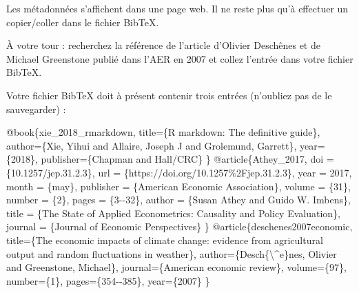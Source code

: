 \documentclass[
  11pt,
]{book}
\newenvironment{Shaded}{\begin{snugshade}}{\end{snugshade}}
\newcommand{\CharTok}[1]{\textcolor[rgb]{0.31,0.60,0.02}{#1}}
\newcommand{\DataTypeTok}[1]{\textcolor[rgb]{0.13,0.29,0.53}{#1}}
\newcommand{\NormalTok}[1]{#1}
\newcommand{\OtherTok}[1]{\textcolor[rgb]{0.56,0.35,0.01}{#1}}
\newcommand{\VariableTok}[1]{\textcolor[rgb]{0.00,0.00,0.00}{#1}}
\numberwithin{equation}{section}
\numberwithin{countremarque}{section}
\newenvironment{greenbox}{
  \begin{tcolorbox}[breakable, colback=vert,coltext=black,
                  colframe=grisfonce]}
 {\end{tcolorbox}}
\begin{document}
Les métadonnées s'affichent dans une page web. Il ne reste plus qu'à effectuer un copier/coller dans le fichier BibTeX.

\begin{greenbox}
À votre tour : recherchez la référence de l'article d'Olivier Deschênes et de Michael Greenstone publié dans l'AER en 2007 et collez l'entrée dans votre fichier BibTeX.

\end{greenbox}

Votre fichier BibTeX doit à présent contenir trois entrées (n'oubliez pas de le sauvegarder) :

\begin{Shaded}
\begin{Highlighting}[]
\VariableTok{@book}\NormalTok{\{}\OtherTok{xie\_2018\_rmarkdown}\NormalTok{,}
  \DataTypeTok{title}\NormalTok{=\{R markdown: The definitive guide\},}
  \DataTypeTok{author}\NormalTok{=\{Xie, Yihui and Allaire, Joseph J and Grolemund, Garrett\},}
  \DataTypeTok{year}\NormalTok{=\{2018\},}
  \DataTypeTok{publisher}\NormalTok{=\{Chapman and Hall/CRC\}}
\NormalTok{\}}
\VariableTok{@article}\NormalTok{\{}\OtherTok{Athey\_2017}\NormalTok{,}
    \DataTypeTok{doi}\NormalTok{ = \{10.1257/jep.31.2.3\},}
    \DataTypeTok{url}\NormalTok{ = \{https://doi.org/10.1257\%2Fjep.31.2.3\},}
    \DataTypeTok{year}\NormalTok{ = 2017,}
    \DataTypeTok{month}\NormalTok{ = \{may\},}
    \DataTypeTok{publisher}\NormalTok{ = \{American Economic Association\},}
    \DataTypeTok{volume}\NormalTok{ = \{31\},}
    \DataTypeTok{number}\NormalTok{ = \{2\},}
    \DataTypeTok{pages}\NormalTok{ = \{3{-}{-}32\},}
    \DataTypeTok{author}\NormalTok{ = \{Susan Athey and Guido W. Imbens\},}
    \DataTypeTok{title}\NormalTok{ = \{The State of Applied Econometrics:}
\NormalTok{    Causality and Policy Evaluation\},}
    \DataTypeTok{journal}\NormalTok{ = \{Journal of Economic Perspectives\}}
\NormalTok{\}}
\VariableTok{@article}\NormalTok{\{}\OtherTok{deschenes2007economic}\NormalTok{,}
  \DataTypeTok{title}\NormalTok{=\{The economic impacts of climate change:}
\NormalTok{  evidence from agricultural output and random fluctuations in weather\},}
  \DataTypeTok{author}\NormalTok{=\{Desch\{}\CharTok{\textbackslash{}\^{}}\NormalTok{e\}nes, Olivier and Greenstone, Michael\},}
  \DataTypeTok{journal}\NormalTok{=\{American economic review\},}
  \DataTypeTok{volume}\NormalTok{=\{97\},}
  \DataTypeTok{number}\NormalTok{=\{1\},}
  \DataTypeTok{pages}\NormalTok{=\{354{-}{-}385\},}
  \DataTypeTok{year}\NormalTok{=\{2007\}}
\NormalTok{\}}
\end{Highlighting}
\end{Shaded}
\end{document}
